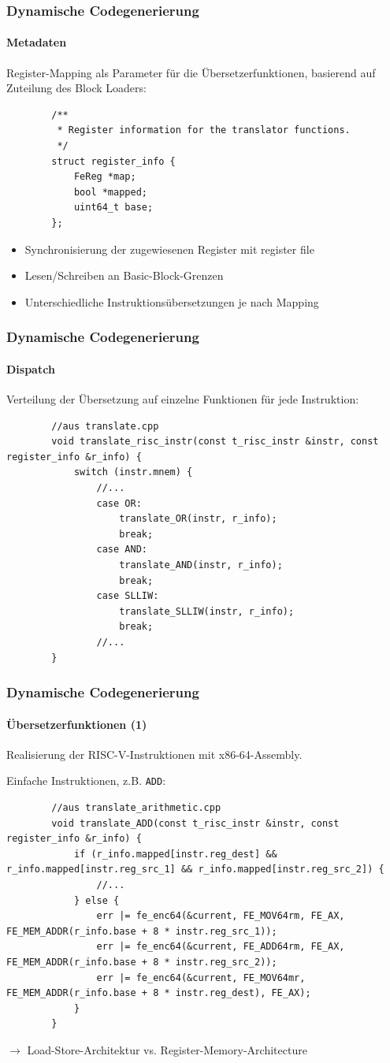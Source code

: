 \documentclass[german]{tum-presentation}
\newcommand{\refer}[0]{\ensuremath{\rightarrow} }
\begin{document}
\begin{frame}[fragile]
	\frametitle{Dynamische Codegenerierung}
	\framesubtitle{Metadaten}
	
	Register-Mapping als Parameter für die Übersetzerfunktionen, basierend auf Zuteilung des Block Loaders:
	\begin{lstlisting}
		/**
		 * Register information for the translator functions.
		 */
		struct register_info {
			FeReg *map;
			bool *mapped;
			uint64_t base;
		};
	\end{lstlisting}
	
	\pause
	\begin{itemize}
		\item Synchronisierung der zugewiesenen Register mit register file
		\item Lesen/Schreiben an Basic-Block-Grenzen
		\item Unterschiedliche Instruktionsübersetzungen je nach Mapping
	\end{itemize}
\end{frame}

\begin{frame}[fragile]
	\frametitle{Dynamische Codegenerierung}
	\framesubtitle{Dispatch}
	
	Verteilung der Übersetzung auf einzelne Funktionen für jede Instruktion:
	
	\begin{lstlisting}
		//aus translate.cpp
		void translate_risc_instr(const t_risc_instr &instr, const register_info &r_info) {
			switch (instr.mnem) {
				//...
				case OR:
					translate_OR(instr, r_info);
					break;
				case AND:
					translate_AND(instr, r_info);
					break;
				case SLLIW:
					translate_SLLIW(instr, r_info);
					break;
				//...
		}
	\end{lstlisting}
\end{frame}

\begin{frame}[fragile]
	\frametitle{Dynamische Codegenerierung}
	\framesubtitle{Übersetzerfunktionen (1)}
	
	Realisierung der RISC-V-Instruktionen mit x86-64-Assembly.
	
	\pause
	\vspace{0.3cm}
	Einfache Instruktionen, z.B. \verb!ADD!:
	\begin{lstlisting}
		//aus translate_arithmetic.cpp
		void translate_ADD(const t_risc_instr &instr, const register_info &r_info) {
			if (r_info.mapped[instr.reg_dest] && r_info.mapped[instr.reg_src_1] && r_info.mapped[instr.reg_src_2]) {
				//...
			} else {
				err |= fe_enc64(&current, FE_MOV64rm, FE_AX, FE_MEM_ADDR(r_info.base + 8 * instr.reg_src_1));
				err |= fe_enc64(&current, FE_ADD64rm, FE_AX, FE_MEM_ADDR(r_info.base + 8 * instr.reg_src_2));
				err |= fe_enc64(&current, FE_MOV64mr, FE_MEM_ADDR(r_info.base + 8 * instr.reg_dest), FE_AX);
			}
		}
	\end{lstlisting}
	
	\pause
	\refer Load-Store-Architektur vs. Register-Memory-Architecture
\end{frame}
\end{document}
